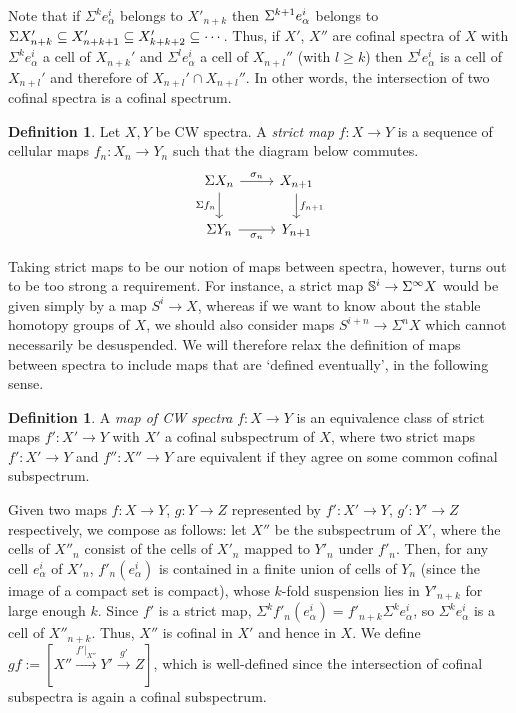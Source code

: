 \documentclass[11pt, titlepage]{article} %
\def\bb{\ensuremath\mathbb}
\def\subq{\ensuremath\subseteq}
\def\SIgma{\ensuremath\Sigma}
\numberwithin{equation}{subsection}
\theoremstyle{plain}
\theoremstyle{definition}
\newtheorem{definition}[theorem]{Definition}
\begin{document}
Note that if \(\Sigma^ke^i_\alpha\) belongs to \(X'_{n+k}\) then \(\SIgma^{k+1}e^i_\alpha\) belongs to \(\Sigma X'_{n+k}\subq X'_{n+k+1}\subq X'_{k+k+2}\subq \cdots\). Thus, if \(X'\), \(X''\) are cofinal spectra of \(X\) with \(\Sigma^k e_{\alpha}^i\) a cell of \(X_{n+k}'\) and \(\Sigma^l e_\alpha^i\) a cell of \(X_{n+l}''\) (with \(l\geq k\)) then \(\Sigma^l e_\alpha^i\) is a cell of \(X_{n+l}'\) and therefore of \(X_{n+l}'\cap X_{n+l}''\). In other words, the intersection of two cofinal spectra is a cofinal spectrum.

\begin{definition}
Let \(X, Y\) be CW spectra. A \textit{strict map} \(f : X \to Y\) is a sequence of cellular maps \(f_n : X_n \to Y_n\) such that the diagram below commutes.
\[\begin{tikzcd}
\Sigma X_n \arrow[r, "\sigma_n"] \arrow[d, swap, "\Sigma f_n"]  & X_{n+1} \arrow[d, "f_{n+1}"]  \\
\SIgma Y_n \arrow[r, swap, "\sigma_n"]  & Y_{n+1}
\end{tikzcd}\]
\end{definition}

Taking strict maps to be our notion of maps between spectra, however, turns out to be too strong a requirement. For instance, a strict map \(\bb{S}^i \to \Sigma^\infty X\) would be given simply by a map \(S^i \to X\), whereas if we want to know about the stable homotopy groups of \(X\), we should also consider maps \(S^{i+n}\to \Sigma^n X\) which cannot necessarily be desuspended. We will therefore relax the definition of maps between spectra to include maps that are `defined eventually', in the following sense. 

\begin{definition}
A \textit{map of CW spectra} \(f : X \to Y\) is an equivalence class of strict maps \(f' : X' \to Y\) with \(X'\) a cofinal subspectrum of \(X\), where two strict maps \(f' : X' \to Y\) and \(f'' : X'' \to Y\) are equivalent if they agree on some common cofinal subspectrum. 
\end{definition}

Given two maps \(f : X \to Y\), \(g : Y \to Z\) represented by \(f' : X' \to Y\), \(g' : Y' \to Z\) respectively, we compose as follows: let \(X''\) be the subspectrum of \(X'\), where the cells of \(X''_n\) consist of the cells of \(X'_n\) mapped to \(Y'_n\) under \(f'_n\). Then, for any cell \(e^i_\alpha\) of \(X'_n\), \(f'_n(e^i_\alpha)\) is contained in a finite union of cells of \(Y_n\) (since the image of a compact set is compact), whose \(k\)-fold suspension lies in \(Y'_{n+k}\) for large enough \(k\). Since \(f'\) is a strict map, \(\Sigma^kf'_n(e^i_\alpha)=f'_{n+k}\Sigma^ke^i_\alpha\), so \(\Sigma^ke^i_\alpha\) is a cell of \(X''_{n+k}\). Thus, \(X''\) is cofinal in \(X'\) and hence in \(X\). We define \(gf := [X'' \xrightarrow{f'|_{X''}}Y' \xrightarrow{g'}Z]\), which is well-defined since the intersection of cofinal subspectra is again a cofinal subspectrum. 
\end{document}
